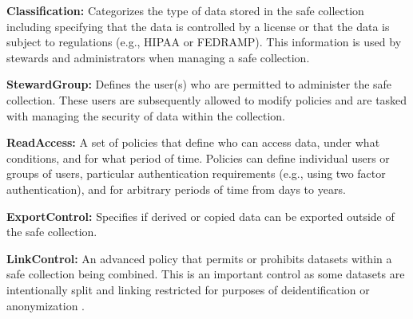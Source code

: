 \textbf{Classification:} Categorizes the type of data stored in the 
safe collection including specifying that the data is controlled by
a license or that the data is subject to regulations (e.g., HIPAA or FEDRAMP).
This information is used by stewards and administrators when 
managing a safe collection.

\textbf{StewardGroup:} Defines the user(s) who are permitted to 
administer the safe collection. These users are subsequently 
allowed to modify policies and are tasked with managing the 
security of data within the collection. 

\textbf{ReadAccess:} A set of policies that define who can
access data, under what conditions, and for what period of time. 
Policies can define individual users or groups of users, particular
authentication requirements (e.g., using two factor authentication), 
and for arbitrary periods of time from days to years. 

\textbf{ExportControl:} Specifies if derived or copied data
can be exported outside of the safe collection. 

\textbf{LinkControl:} An advanced policy that permits
or prohibits datasets within a safe collection being
combined. This is an important control as some datasets
are intentionally split and linking restricted for purposes
of deidentification or anonymization . 




